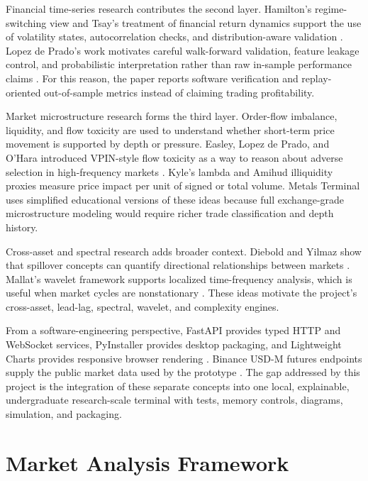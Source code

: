 \documentclass[conference]{IEEEtran}
\begin{document}
Financial time-series research contributes the second layer. Hamilton's
regime-switching view and Tsay's treatment of financial return dynamics
support the use of volatility states, autocorrelation checks, and
distribution-aware validation \cite{hamilton1994,tsay2010}. Lopez de Prado's
work motivates careful walk-forward validation, feature leakage control, and
probabilistic interpretation rather than raw in-sample performance claims
\cite{lopez2018}. For this reason, the paper reports software verification
and replay-oriented out-of-sample metrics instead of claiming trading
profitability.

Market microstructure research forms the third layer. Order-flow imbalance,
liquidity, and flow toxicity are used to understand whether short-term price
movement is supported by depth or pressure. Easley, Lopez de Prado, and
O'Hara introduced VPIN-style flow toxicity as a way to reason about adverse
selection in high-frequency markets \cite{easley2012}. Kyle's lambda and
Amihud illiquidity proxies measure price impact per unit of signed or total
volume. Metals Terminal uses simplified educational versions of these ideas
because full exchange-grade microstructure modeling would require richer
trade classification and depth history.

Cross-asset and spectral research adds broader context. Diebold and Yilmaz
show that spillover concepts can quantify directional relationships between
markets \cite{diebold2012}. Mallat's wavelet framework supports localized
time-frequency analysis, which is useful when market cycles are nonstationary
\cite{mallat1989}. These ideas motivate the project's cross-asset,
lead-lag, spectral, wavelet, and complexity engines.

From a software-engineering perspective, FastAPI provides typed HTTP and
WebSocket services, PyInstaller provides desktop packaging, and Lightweight
Charts provides responsive browser rendering \cite{fastapi,pyinstaller,
lightweightcharts}. Binance USD-M futures endpoints supply the public market
data used by the prototype \cite{binance}. The gap addressed by this project
is the integration of these separate concepts into one local, explainable,
undergraduate research-scale terminal with tests, memory controls, diagrams,
simulation, and packaging.

\section{Market Analysis Framework}
\end{document}
